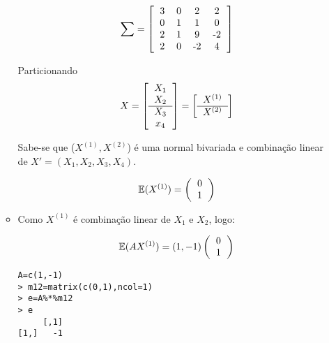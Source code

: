 \documentclass[11pt,a4paper]{book}
\begin{document}
\begin{enumerate}
\begin{itemize}
					\begin{eqnarray*}
						\sum=\left[
						\begin{tabular}{c c c c }
						 3 & 0 & 2 & 2\\
						 0 & 1 & 1 & 0\\
						 2 & 1 & 9 & -2\\
						 2 & 0 & -2 & 4\\
						\end{tabular}
						\right]
					\end{eqnarray*}
					
					Particionando
					\begin{eqnarray*}
					X=\left[
					\begin{tabular}{c}
					$X_1$\\
					$X_2$\\
					\hline
					$X_3$\\
					$x_4$\\
					\end{tabular}
					\right]=
					\left[\begin{tabular}{c}
					$X^{(1)}$\\
					\hline
					$X^{(2)}$\\
					\end{tabular}
					\right]
					\end{eqnarray*}
					
					Sabe-se que ($X^{(1)},X^{(2)}$) é uma normal bivariada e combinação linear de $X'=(X_1,X_2,X_3,X_4)$.
					
					\begin{eqnarray*}
						\mathbb{E}(X^{(1)})=\left(
						\begin{tabular}{c}
						0\\
						1\\
						\end{tabular}
						\right)
					\end{eqnarray*}
					\item
					Como $X^{(1)}$ é combinação linear de $X_1$ e $X_2$, logo:
					
					\begin{eqnarray*}
						\mathbb{E}(AX^{(1)})=(1,-1)\left(
						\begin{tabular}{c}
						0\\
						1\\
						\end{tabular}
						\right)
					\end{eqnarray*}
					\begin{lstlisting}
A=c(1,-1)
> m12=matrix(c(0,1),ncol=1)
> e=A%*%m12
> e
     [,1]
[1,]   -1
					\end{lstlisting}
					

\end{itemize}
\end{enumerate}
\end{document}
